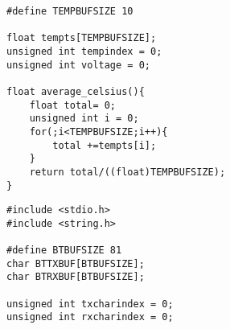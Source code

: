 \begin{code}
\label{code:sub-unit-temp-func}
\begin{verbatim}
#define TEMPBUFSIZE 10

float tempts[TEMPBUFSIZE];
unsigned int tempindex = 0;
unsigned int voltage = 0;

float average_celsius(){
    float total= 0;
    unsigned int i = 0;
    for(;i<TEMPBUFSIZE;i++){
        total +=tempts[i];
    }
    return total/((float)TEMPBUFSIZE);
}
\end{verbatim}
\end{code}
\begin{code}
\label{code:sub-unit-bluetooth.h}
 \begin{verbatim}
#include <stdio.h>
#include <string.h>

#define BTBUFSIZE 81
char BTTXBUF[BTBUFSIZE];
char BTRXBUF[BTBUFSIZE];

unsigned int txcharindex = 0;
unsigned int rxcharindex = 0;


\end{verbatim}
\end{code}
